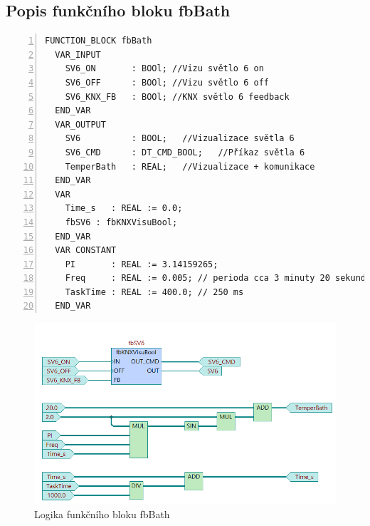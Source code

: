 \subsection{Popis funkčního bloku fbBath}
\label{apend:fbBath}
\begin{lstlisting}[language=ST, breaklines=true, numbers=left, numberstyle=\small, numbersep=10pt, frame=single, basicstyle=\ttfamily\small, caption={fbBath}, label={lst:fbBath}]
  FUNCTION_BLOCK fbBath
  VAR_INPUT
    SV6_ON       : BOOl; //Vizu světlo 6 on
    SV6_OFF      : BOOl; //Vizu světlo 6 off
    SV6_KNX_FB   : BOOl; //KNX světlo 6 feedback
  END_VAR
  VAR_OUTPUT
    SV6          : BOOL;   //Vizualizace světla 6
    SV6_CMD      : DT_CMD_BOOL;   //Příkaz světla 6
    TemperBath   : REAL;   //Vizualizace + komunikace
  END_VAR
  VAR
    Time_s   : REAL := 0.0;
    fbSV6 : fbKNXVisuBool;
  END_VAR
  VAR CONSTANT
    PI       : REAL := 3.14159265;
    Freq     : REAL := 0.005; // perioda cca 3 minuty 20 sekund
    TaskTime : REAL := 400.0; // 250 ms
  END_VAR
\end{lstlisting}
\begin{figure}[!ht]
  \begin{center}
  \includegraphics[scale=0.55]{obrazky/fbBath.png}
  \end{center}
  \caption[Logika funkčního bloku fbBath]{Logika funkčního bloku fbBath}
  \label{fig:fbBath}
\end{figure}
\pagebreak
\newpage

